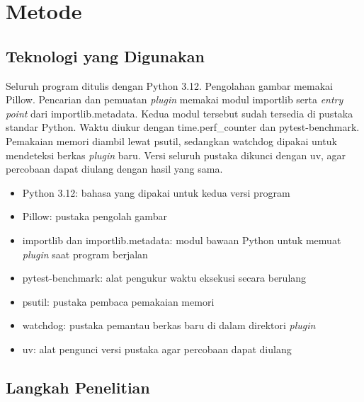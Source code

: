 \documentclass[11pt,a4paper]{article}
\begin{document}
\section{Metode}

\subsection{Teknologi yang Digunakan}

Seluruh program ditulis dengan Python 3.12. Pengolahan gambar memakai Pillow. Pencarian dan pemuatan \textit{plugin} memakai modul importlib serta \textit{entry point} dari importlib.metadata. Kedua modul tersebut sudah tersedia di pustaka standar Python. Waktu diukur dengan time.perf\_counter dan pytest-benchmark. Pemakaian memori diambil lewat psutil, sedangkan watchdog dipakai untuk mendeteksi berkas \textit{plugin} baru. Versi seluruh pustaka dikunci dengan uv, agar percobaan dapat diulang dengan hasil yang sama.

\begin{itemize}[leftmargin=*]
  \item Python 3.12: bahasa yang dipakai untuk kedua versi program
  \item Pillow: pustaka pengolah gambar
  \item importlib dan importlib.metadata: modul bawaan Python untuk memuat \textit{plugin} saat program berjalan
  \item pytest-benchmark: alat pengukur waktu eksekusi secara berulang
  \item psutil: pustaka pembaca pemakaian memori
  \item watchdog: pustaka pemantau berkas baru di dalam direktori \textit{plugin}
  \item uv: alat pengunci versi pustaka agar percobaan dapat diulang
\end{itemize}

\subsection{Langkah Penelitian}
\end{document}
